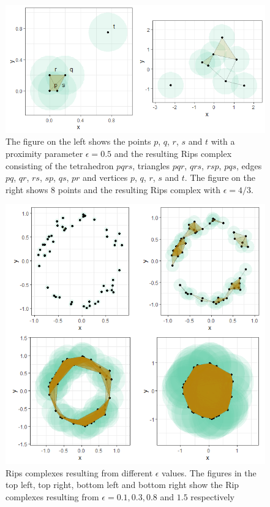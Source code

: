 \documentclass[11pt,a4paper,]{article}
\theoremstyle{definition}
\theoremstyle{definition}
\theoremstyle{definition}
\theoremstyle{remark}
\begin{document}
\begin{figure}
    \centering
    \includegraphics[scale=0.8]{../Graphics/simplicial_complex.png}
    \caption{The figure on the left shows the points $p$, $q$, $r$, $s$ and $t$ with a proximity parameter $\epsilon = 0.5$ and the resulting Rips complex consisting of the tetrahedron $pqrs$, triangles $pqr$, $qrs$, $rsp$,  $pqs$, edges $pq$, $qr$, $rs$, $sp$, $qs$, $pr$ and vertices $p$, $q$, $r$, $s$ and $t$. The figure on the right shows $8$ points and the resulting Rips complex with $\epsilon=4/3$.}
    \label{fig:tetrahedron}
\end{figure}

\begin{figure}[!ht]
    \centering
    \includegraphics[scale=0.8]{../Graphics/four_plots_diff_radi.png}
    \caption{Rips complexes resulting from different $\epsilon$ values. The figures in the top left, top right, bottom left and bottom right show the Rip complexes resulting from $\epsilon = 0.1, 0.3, 0.8$ and $1.5$ respectively}
    \label{fig:annulus}
\end{figure}
\end{document}
